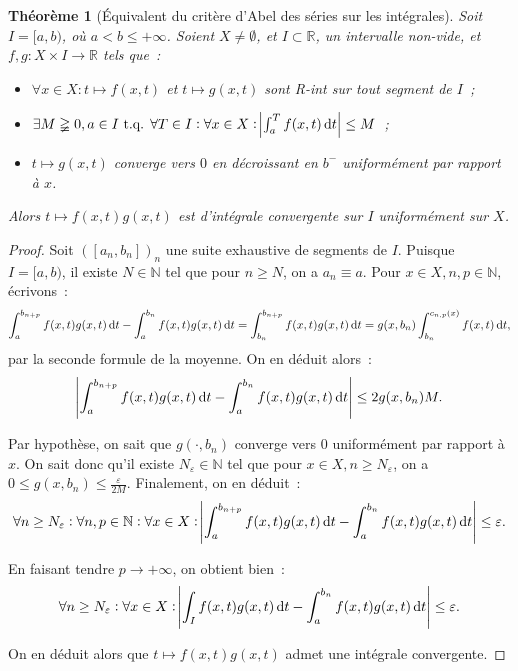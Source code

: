 \documentclass{report}
\newtheorem{thm}{Théorème}[chapter]
\theoremstyle{definition}
\theoremstyle{remark}
\newcommand{\R}{\mathbb R}
\newcommand{\N}{\mathbb N}
\newcommand{\tq}{\text{ t.q. }}
\newcommand{\pinfty}{{+\infty}}
\begin{document}
			\begin{thm}[Équivalent du critère d'Abel des séries sur les intégrales] Soit $I = [a, b)$, où $a < b \leq \pinfty$. Soient $X \neq \emptyset$, et
			$I \subset \R$, un intervalle non-vide, et $f, g : X \times I \to \R$ tels que~:
			\begin{itemize}
				\item $\forall x \in X : t \mapsto f(x, t)$ et $t \mapsto g(x, t)$ sont R-int sur tout segment de $I$~;
				\item $\exists M \gneqq 0, a \in I \tq \forall T \in I : \forall x \in X : \abs {\int_a^T f(x, t)\dif t} \leq M$~;
				\item $t \mapsto g(x, t)$ converge vers $0$ en décroissant en $b^-$ uniformément par rapport à $x$.
			\end{itemize}

			Alors $t \mapsto f(x, t)g(x, t)$ est d'intégrale convergente sur $I$ uniformément sur $X$.
			\end{thm}

			\begin{proof} Soit $([a_n, b_n])_n$ une suite exhaustive de segments de $I$. Puisque $I = [a, b)$, il existe $N \in \N$ tel que pour $n \geq N$, on
			a $a_n \equiv a$. Pour $x \in X, n, p \in \N$, écrivons~:
			\[\int_a^{b_{n+p}}f(x, t)g(x, t)\dif t - \int_a^{b_n}f(x, t)g(x, t)\dif t = \int_{b_n}^{b_{n+p}}f(x, t)g(x, t)\dif t
				= g(x, b_n)\int_{b_n}^{c_{n, p}(x)}f(x, t)\dif t,\]
			par la seconde formule de la moyenne. On en déduit alors~:
			\[\abs {\int_a^{b_{n+p}}f(x, t)g(x, t)\dif t - \int_a^{b_n}f(x, t)g(x, t)\dif t} \leq 2g(x, b_n)M.\]

			Par hypothèse, on sait que $g(\cdot, b_n)$ converge vers $0$ uniformément par rapport à $x$. On sait donc qu'il existe $N_\varepsilon \in \N$
			tel que pour $x \in X, n \geq N_\varepsilon$, on a $0 \leq g(x, b_n) \leq \frac \varepsilon{2M}$. Finalement, on en déduit~:
			\[\forall n \geq N_\varepsilon : \forall n, p \in \N : \forall x \in X : \abs {\int_a^{b_{n+p}}f(x, t)g(x, t)\dif t - \int_a^{b_n}f(x, t)g(x, t)\dif t}
				\leq \varepsilon.\]

			En faisant tendre $p \to \pinfty$, on obtient bien~:
			\[\forall n \geq N_\varepsilon : \forall x \in X : \abs {\int_If(x, t)g(x, t)\dif t - \int_a^{b_n}f(x, t)g(x, t)\dif t} \leq \varepsilon.\]

			On en déduit alors que $t \mapsto f(x, t)g(x, t)$ admet une intégrale convergente.
			\end{proof}
\end{document}
